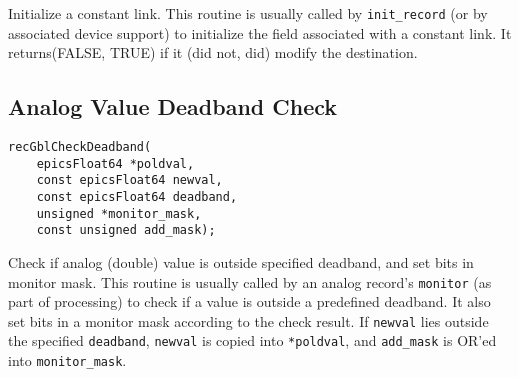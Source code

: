 Initialize a constant link.
This routine is usually called by \verb|init_record| (or by associated device support) to initialize the field associated with a constant link.
It returns(FALSE, TRUE) if it (did not, did) modify the destination.

\subsection{Analog Value Deadband Check}

\begin{verbatim}
recGblCheckDeadband(
    epicsFloat64 *poldval,
    const epicsFloat64 newval,
    const epicsFloat64 deadband,
    unsigned *monitor_mask,
    const unsigned add_mask);
\end{verbatim}

Check if analog (double) value is outside specified deadband, and set bits in monitor mask.
This routine is usually called by an analog record's \verb|monitor| (as part of processing) to check if a value is outside a predefined deadband.
It also set bits in a monitor mask according to the check result.
If \verb|newval| lies outside the specified \verb|deadband|, \verb|newval| is copied into \verb|*poldval|, and \verb|add_mask| is OR'ed into \verb|monitor_mask|.
